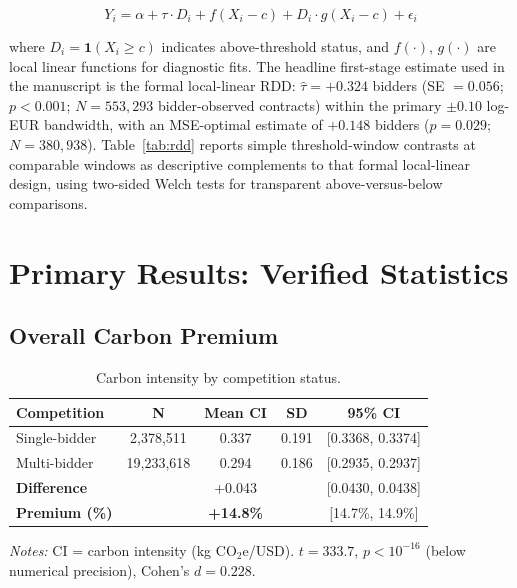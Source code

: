 \documentclass[11pt]{article}
\newcommand{\tabnoteblock}[1]{%
    \par\vspace{0.45em}%
    \begin{minipage}{0.98\linewidth}
    \footnotesize\raggedright #1
    \end{minipage}\par
}
\newcommand{\tabnotes}[1]{\tabnoteblock{\textit{Notes:} #1}}
\begin{document}
\begin{equation}
Y_i = \alpha + \tau \cdot D_i + f(X_i - c) + D_i \cdot g(X_i - c) + \epsilon_i
\end{equation}

where $D_i = \mathbf{1}(X_i \geq c)$ indicates above-threshold status, and $f(\cdot)$, $g(\cdot)$ are local linear functions for diagnostic fits. The headline first-stage estimate used in the manuscript is the formal local-linear RDD: $\hat{\tau} = +0.324$ bidders (SE $= 0.056$; $p < 0.001$; $N = 553{,}293$ bidder-observed contracts) within the primary $\pm0.10$ log-EUR bandwidth, with an MSE-optimal estimate of $+0.148$ bidders ($p = 0.029$; $N = 380{,}938$). Table~\ref{tab:rdd} reports simple threshold-window contrasts at comparable windows as descriptive complements to that formal local-linear design, using two-sided Welch tests for transparent above-versus-below comparisons.

\section{Primary Results: Verified Statistics}

\subsection{Overall Carbon Premium}

\begin{table}[H]
\centering
\caption{Carbon intensity by competition status.}
\label{tab:primary}
\begin{tabular}{lcccc}
\toprule
\textbf{Competition} & \textbf{N} & \textbf{Mean CI} & \textbf{SD} & \textbf{95\% CI} \\
\midrule
Single-bidder & 2,378,511 & 0.337 & 0.191 & [0.3368, 0.3374] \\
Multi-bidder & 19,233,618 & 0.294 & 0.186 & [0.2935, 0.2937] \\
\midrule
\textbf{Difference} & & +0.043 & & [0.0430, 0.0438] \\
\textbf{Premium (\%)} & & \textbf{+14.8\%} & & [14.7\%, 14.9\%] \\
\bottomrule
\end{tabular}

\tabnotes{CI = carbon intensity (kg CO$_2$e/USD). $t = 333.7$, $p < 10^{-16}$ (below numerical precision), Cohen's $d = 0.228$.
}
\end{table}
\end{document}
